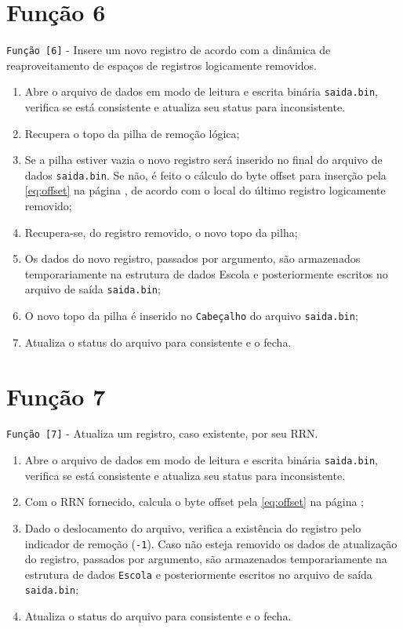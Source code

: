 \documentclass[
	12pt,				%
	openany,			%
	twoside,			%
	a4paper,			%
	english,			%
	french,				%
	spanish,			%
	brazil,				%
	]{abntex2}
\begin{document}
\section{Função 6}
\verb|Função [6]| - Insere um novo registro de acordo com a dinâmica de reaproveitamento de espaços de registros logicamente removidos.

\begin{enumerate}
    \item Abre o arquivo de dados em modo de leitura e escrita binária \verb|saida.bin|, verifica se está consistente e atualiza seu status para inconsistente.
    \item Recupera o topo da pilha de remoção lógica;
    \item Se a pilha estiver vazia o novo registro será inserido no final do arquivo de dados \verb|saida.bin|. Se não, é feito o cálculo do byte offset para inserção pela \autoref{eq:offset} na página \pageref{eq:offset}, de acordo com o local do último registro logicamente removido;
    \item Recupera-se, do registro removido, o novo topo da pilha;
    \item Os dados do novo registro, passados por argumento, são armazenados temporariamente na estrutura de dados Escola e posteriormente escritos no arquivo de saída \verb|saida.bin|;
    \item O novo topo da pilha é inserido no \verb|Cabeçalho| do arquivo \verb|saida.bin|;
    \item Atualiza o status do arquivo para consistente e o fecha.
\end{enumerate}

\section{Função 7}
\verb|Função [7]| - Atualiza um registro, caso existente, por seu RRN.

\begin{enumerate}
    \item Abre o arquivo de dados em modo de leitura e escrita binária \verb|saida.bin|, verifica se está consistente e atualiza seu status para inconsistente.
    \item Com o RRN fornecido, calcula o byte offset pela \autoref{eq:offset} na página \pageref{eq:offset};
    \item Dado o deslocamento do arquivo, verifica a existência do registro pelo indicador de remoção (\verb|-1|). Caso não esteja removido os dados de atualização do registro, passados por argumento, são armazenados temporariamente na estrutura de dados \verb|Escola| e posteriormente escritos no arquivo de saída \verb|saida.bin|;
    \item Atualiza o status do arquivo para consistente e o fecha.
\end{enumerate}
\end{document}

